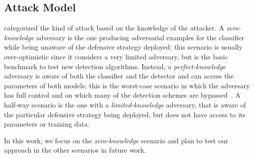 \subsection{Attack Model}
\label{subsec:attack-model}

\citet{biggio2013evasion} categorized the kind of attack based on the knowledge of the attacker.
A \emph{zero-knowledge} adversary is the one producing adversarial examples for the classifier while being unaware of the defensive strategy deployed;
this scenario is usually over-optimistic since it considers a very limited adversary, but is the basic benchmark to test new detection algorithms.
Instead, a \emph{perfect-knowledge} adversary is aware of both the classifier and the detector and can access the parameters of both models;
this is the worst-case scenario in which the adversary has full control and on which many of the detection schemes are bypassed~\cite{carlini2017adversarial}.
A half-way scenario is the one with a \emph{limited-knowledge} adversary, that is aware of the particular defensive strategy being deployed, but does not have access to its parameters or training data.

In this work, we focus on the \emph{zero-knowledge} scenario and plan to test our approach in the other scenarios in future work.



%
%

